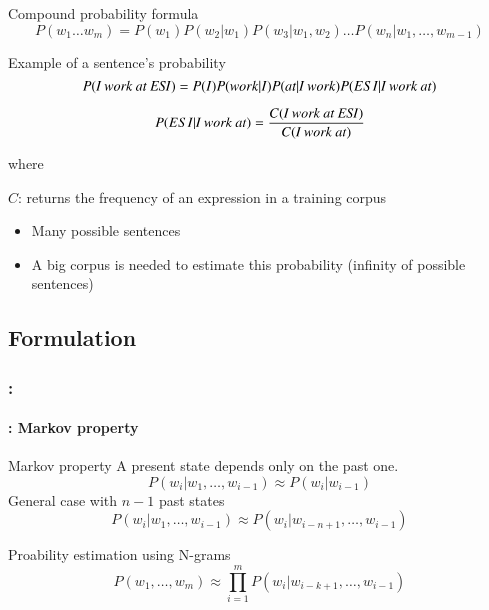 \documentclass[xcolor=table]{beamer}
\begin{document}
\begin{frame}
	\frametitle{\insertshortsubtitle}
	\framesubtitle{\insertsection}
	
	\vspace{-6pt}
	\begin{block}{Compound probability formula}
		\[ P(w_1 \ldots w_m) =  P(w_1) P(w_2 | w_1) P(w_3 | w_1, w_2) \ldots P(w_n | w_1, \ldots, w_{m-1}) \]
	\end{block}
	
	\vspace{-6pt}
	\begin{exampleblock}{Example of a sentence's probability}
		\[ P(\text{\textit{I work at ESI}}) =  P(I) P(work | I) P(\text{\textit{at}} | \text{\textit{I work}}) P(ESI | \text{\textit{I work at}}) \]
		
		\[ P(ESI | \text{\textit{I work at}}) = \frac{C(\text{\textit{I work at ESI}})}{C( \text{\textit{I work at}})} \] 
		
		where 
		
		$C$: returns the frequency of an expression in a training corpus
	\end{exampleblock}
	
	\begin{itemize}
		\item Many possible sentences
		\item A big corpus is needed to estimate this probability (infinity of possible sentences)
	\end{itemize}

\end{frame}

\subsection{Formulation}

\begin{frame}
	\frametitle{\insertshortsubtitle: \insertsection}
	\framesubtitle{\insertsubsection: Markov property}

	\begin{block}{Markov property}
		A present state depends only on the past one. 
		\[%
		P(w_i | w_1,\ldots, w_{i-1}) \approx P(w_i | w_{i-1})
		\]
		General case with $n-1$ past states
		\[%
		P(w_i | w_1,\ldots, w_{i-1}) \approx P(w_i | w_{i-n+1}, \ldots, w_{i-1})
		\]
	\end{block}
	
	\begin{block}{Proability estimation using N-grams}
		\[
		P(w_1,\ldots, w_{m}) \approx \prod_{i=1}^m P(w_i | w_{i-k+1}, \ldots, w_{i-1})
		\]
	\end{block}

\end{frame}
\end{document}
